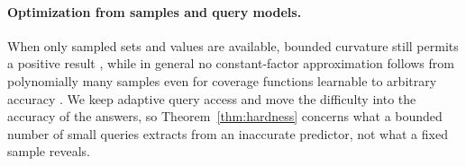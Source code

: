 \paragraph{Optimization from samples and query models.}
When only sampled sets and values are available, bounded curvature still
permits a positive result \citep{balkanski2016power}, while in general no
constant-factor approximation follows from polynomially many samples even for
coverage functions learnable to arbitrary accuracy
\citep{balkanski2017limitations}.  We keep adaptive query access and move the
difficulty into the accuracy of the answers, so Theorem~\ref{thm:hardness}
concerns what a bounded number of small queries extracts from an inaccurate
predictor, not what a fixed sample reveals.
